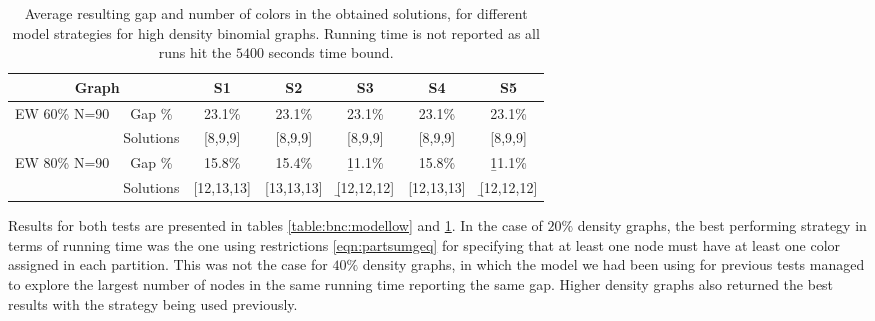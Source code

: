 \begin{table}[h]
\centering
\begin{tabular}{|cc|c|c|c|c|c|}
\hline
\multicolumn{2}{|c|}{Graph} & \multicolumn{1}{|c|}{S1} & \multicolumn{1}{|c|}{S2} & \multicolumn{1}{|c|}{S3} & \multicolumn{1}{|c|}{S4} & \multicolumn{1}{|c|}{S5}
\\
\hline
\multirow{2}{*}{EW 60\% N=90} & Gap \% & 23.1\%  & 23.1\% & 23.1\% & 23.1\% & 23.1\% \\
& Solutions & [8,9,9] & [8,9,9] & [8,9,9] & [8,9,9] & [8,9,9]
\\
\hline
\multirow{2}{*}{EW 80\% N=90} & Gap \% & 15.8\% & 15.4\%  & \b{11.1}\%  & 15.8\%  & \b{11.1}\%  \\
& Solutions & [12,13,13] & [13,13,13] & \b{[12,12,12]} & [12,13,13] & \b{[12,12,12]}
\\
\hline 
 \end{tabular} 
 \caption{Average resulting gap and number of colors in the obtained solutions, for different model strategies for high density binomial graphs. Running time is not reported as all runs hit the $5400$ seconds time bound.}
\label{table:bnc:modelhigh}

\end{table}

 Results for both tests are presented in tables \ref{table:bnc:modellow} and \ref{table:bnc:modelhigh}. In the case of $20\%$ density graphs, the best performing strategy in terms of running time was the one using restrictions \ref{eqn:partsumgeq} for specifying that at least one node must have at least one color assigned in each partition. This was not the case for $40\%$ density graphs, in which the model we had been using for previous tests managed to explore the largest number of nodes in the same running time reporting the same gap. Higher density graphs also returned the best results with the strategy being used previously.

